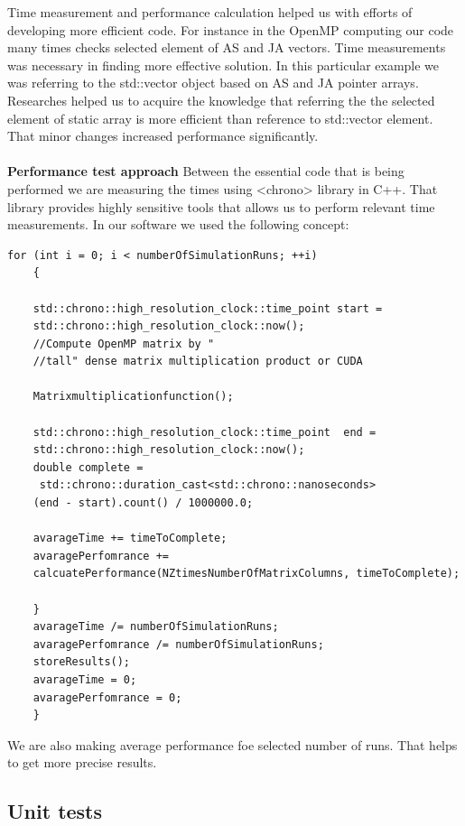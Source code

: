 \documentclass{scrreprt}
\begin{document}
Time measurement and performance calculation helped us with efforts of developing more efficient code.
For instance in the OpenMP computing our code  many times checks selected element of AS and JA vectors. Time measurements was necessary in finding more effective solution. In this particular example we was referring to the std::vector object based on AS and JA pointer arrays. Researches helped us to acquire the knowledge that referring the the selected element of static array is more efficient than reference to std::vector element. That minor changes increased performance significantly. 
\\
\\
\textbf{Performance test approach}
Between the essential code that is being performed we are measuring the times using <chrono> library in C++. That library provides highly sensitive tools that allows us to perform relevant time measurements. In our software we used the following concept:
\\
\begin{lstlisting}
for (int i = 0; i < numberOfSimulationRuns; ++i)
	{

	std::chrono::high_resolution_clock::time_point start = 
	std::chrono::high_resolution_clock::now();
	//Compute OpenMP matrix by "
	//tall" dense matrix multiplication product or CUDA
			
	Matrixmultiplicationfunction();

	std::chrono::high_resolution_clock::time_point  end = 
	std::chrono::high_resolution_clock::now();
	double complete =
	 std::chrono::duration_cast<std::chrono::nanoseconds>
	(end - start).count() / 1000000.0;

	avarageTime += timeToComplete;
	avaragePerfomrance += 
	calcuatePerformance(NZtimesNumberOfMatrixColumns, timeToComplete);	
			
	}
	avarageTime /= numberOfSimulationRuns;
	avaragePerfomrance /= numberOfSimulationRuns;
	storeResults();
	avarageTime = 0;
	avaragePerfomrance = 0;
	}

\end{lstlisting}


We are also making average performance foe selected number of runs. That helps to get more precise results.


\subsection{Unit tests}
\end{document}

